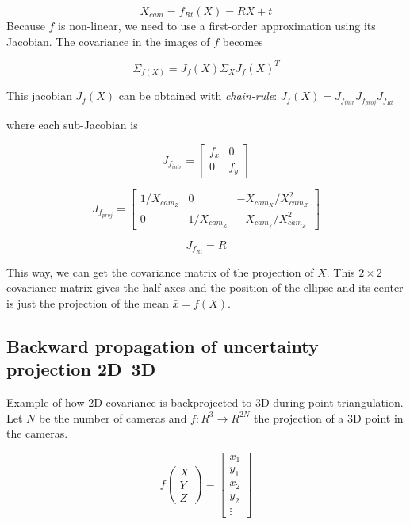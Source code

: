 \begin{equation}
    X_{cam} = f_{Rt}(X) = R X + t
\end{equation}
Because $f$ is non-linear, we need to use a first-order approximation using its Jacobian. The covariance in the images of $f$ becomes

\begin{equation}
    \Sigma_{f(X)} = J_f(X) \Sigma_X J_f(X)^T
\end{equation}

This jacobian $J_f(X)$ can be obtained with \textit{chain-rule}: $J_f(X) = J_{f_{intr}} J_{f_{proj}} J_{f_{Rt}}$

where each sub-Jacobian is

\begin{equation}
   J_{f_{intr}} = \left[\begin{array}{cc}
       f_x & 0 \\
        0 & f_y
   \end{array}\right]
\end{equation}

\begin{equation}
   J_{f_{proj}} = \left[\begin{array}{ccc}
       1/X_{cam_Z} & 0 & - X_{cam_X}/X^2_{cam_Z} \\
       0 & 1/X_{cam_Z} & - X_{cam_Y}/X^2_{cam_Z}
   \end{array}\right]
\end{equation}

\begin{equation}
    J_{f_{Rt}} = R
\end{equation}


This way, we can get the covariance matrix of the projection of $X$. This $2\times2$ covariance matrix gives the half-axes and the position of the ellipse and its center is just the projection of the mean $\bar{x} = f(X)$.


\subsection{Backward propagation of uncertainty projection 2D~3D}
Example of how 2D covariance is backprojected to 3D during point triangulation.
Let $N$ be the number of cameras and $f: R^3 \rightarrow R^{2N}$ the projection of a 3D point in the cameras.

\begin{equation}
    f\left(\begin{array}{c}
        X \\ Y \\ Z
    \end{array}\right) = 
    \left[\begin{array}{c}
        x_1 \\ y_1 \\ x_2 \\ y_2 \\ \vdots
    \end{array}\right]
\end{equation}

